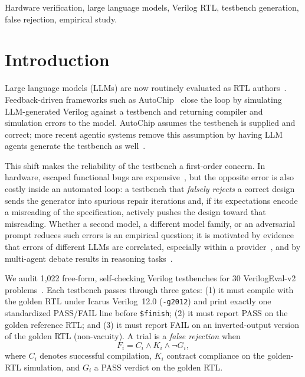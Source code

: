 \documentclass[conference]{IEEEtran}
\begin{document}
\begin{IEEEkeywords}
Hardware verification, large language models, Verilog RTL, testbench generation, false rejection, empirical study.
\end{IEEEkeywords}

\section{Introduction}
Large language models (LLMs) are now routinely evaluated as RTL authors~\cite{liu2023verilogeval, pinckney2024revisiting, lu2024rtllm, blocklove2023chipchat}. Feedback-driven frameworks such as AutoChip~\cite{thakur2023autochip} close the loop by simulating LLM-generated Verilog against a testbench and returning compiler and simulation errors to the model. AutoChip assumes the testbench is supplied and correct; more recent agentic systems remove this assumption by having LLM agents generate the testbench as well~\cite{zhao2024mage, qiu2024autobench, qiu2024correctbench}.

This shift makes the reliability of the testbench a first-order concern. In hardware, escaped functional bugs are expensive~\cite{wile2005verilog}, but the opposite error is also costly inside an automated loop: a testbench that \textit{falsely rejects} a correct design sends the generator into spurious repair iterations and, if its expectations encode a misreading of the specification, actively pushes the design toward that misreading. Whether a second model, a different model family, or an adversarial prompt reduces such errors is an empirical question; it is motivated by evidence that errors of different LLMs are correlated, especially within a provider~\cite{kim2025correlated}, and by multi-agent debate results in reasoning tasks~\cite{du2023debate}.

We audit 1,022 free-form, self-checking Verilog testbenches for 30 VerilogEval-v2 problems~\cite{liu2023verilogeval,pinckney2024revisiting}. Each testbench passes through three gates: (1) it must compile with the golden RTL under Icarus Verilog~12.0 (\texttt{-g2012}) and print exactly one standardized PASS/FAIL line before \texttt{\$finish}; (2) it must report PASS on the golden reference RTL; and (3) it must report FAIL on an inverted-output version of the golden RTL (non-vacuity). A trial is a \textit{false rejection} when
\begin{equation}
F_i = C_i \land K_i \land \neg G_i,
\label{eq:fr_def}
\end{equation}
where $C_i$ denotes successful compilation, $K_i$ contract compliance on the golden-RTL simulation, and $G_i$ a PASS verdict on the golden RTL.
\end{document}
